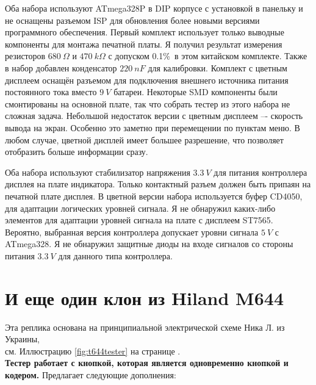 Оба набора используют ATmega328P в DIP корпусе с установкой в панельку и
не оснащены разъемом ISP для обновления более новыми версиями программного обеспечения.
Первый комплект использует только выводные компоненты для монтажа печатной платы.
Я получил результат измерения резисторов \(680~\Omega\) и \(470~k\Omega\) с допуском 0.1\%\ в
этом китайском комплекте.
Также в набор добавлен конденсатор \(220~nF\) для калибровки.
Комплект с цветным дисплеем оснащён разъемом для подключения внешнего источника питания постоянного тока
вместо \(9~V\) батареи.
Некоторые SMD компоненты были смонтированы на основной плате, так что собрать тестер 
из этого набора не сложная задача.
Небольшой недостаток версии с цветным дисплеем –- скорость вывода на экран.
Особенно это заметно при  перемещении по пунктам меню.
В любом случае, цветной дисплей имеет большее разрешение, что позволяет отобразить больше информации сразу.

Оба набора используют стабилизатор напряжения \(3.3~V\) для питания контроллера
дисплея на плате индикатора.
Только контактный разъем должен быть припаян на печатной плате дисплея.
В цветной версии набора используется буфер CD4050, для адаптации логических уровней сигнала.
Я не обнаружил каких-либо элементов для адаптации уровней сигнала на плате с дисплеем ST7565.
Вероятно, выбранная версия контроллера допускает уровни сигнала \(5~V\) с ATmega328.
Я не обнаружил защитные диоды на входе сигналов со стороны питания \(3.3~V\) для данного типа контроллера.
\section{И еще один клон из Hiland M644}
Эта реплика основана на принципиальной электрической схеме Ника Л. из Украины,
\\см. Иллюстрацию \ref{fig:t644tester} на странице \pageref{fig:t644tester}.\\
\textbf{ Тестер работает с кнопкой, которая является одновременно кнопкой и кодером.}
Предлагает следующие дополнения:

